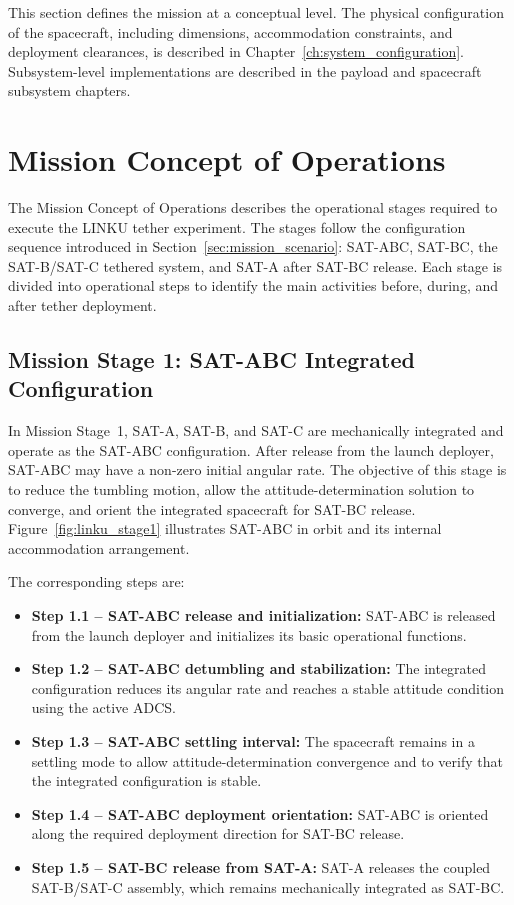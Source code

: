 This section defines the mission at a conceptual level. The physical configuration of the spacecraft, including dimensions, accommodation constraints, and deployment clearances, is described in Chapter~\ref{ch:system_configuration}. Subsystem-level implementations are described in the payload and spacecraft subsystem chapters.

\section{Mission Concept of Operations}
\label{sec:mission_conops}

The Mission Concept of Operations describes the operational stages required to execute the LINKU tether experiment. The stages follow the configuration sequence introduced in Section~\ref{sec:mission_scenario}: SAT-ABC, SAT-BC, the SAT-B/SAT-C tethered system, and SAT-A after SAT-BC release. Each stage is divided into operational steps to identify the main activities before, during, and after tether deployment.

\subsection{Mission Stage 1: SAT-ABC Integrated Configuration}
\label{sub:conops_stage1_satabc}
In Mission Stage~1, SAT-A, SAT-B, and SAT-C are mechanically integrated and operate as the SAT-ABC configuration. After release from the launch deployer, SAT-ABC may have a non-zero initial angular rate. The objective of this stage is to reduce the tumbling motion, allow the attitude-determination solution to converge, and orient the integrated spacecraft for SAT-BC release. Figure~\ref{fig:linku_stage1} illustrates SAT-ABC in orbit and its internal accommodation arrangement.

The corresponding steps are:
\begin{itemize}
    \item \textbf{Step 1.1 -- SAT-ABC release and initialization:} SAT-ABC is released from the launch deployer and initializes its basic operational functions.

    \item \textbf{Step 1.2 -- SAT-ABC detumbling and stabilization:} The integrated configuration reduces its angular rate and reaches a stable attitude condition using the active ADCS.

    \item \textbf{Step 1.3 -- SAT-ABC settling interval:} The spacecraft remains in a settling mode to allow attitude-determination convergence and to verify that the integrated configuration is stable.

    \item \textbf{Step 1.4 -- SAT-ABC deployment orientation:} SAT-ABC is oriented along the required deployment direction for SAT-BC release.

    \item \textbf{Step 1.5 -- SAT-BC release from SAT-A:} SAT-A releases the coupled SAT-B/SAT-C assembly, which remains mechanically integrated as SAT-BC.
\end{itemize}

